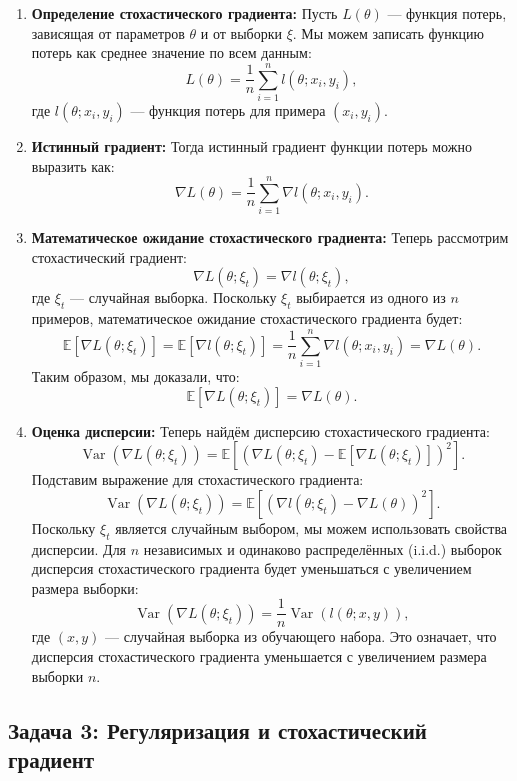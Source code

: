 \begin{enumerate}
    \item \textbf{Определение стохастического градиента:} Пусть \( L(\theta) \) — функция потерь, зависящая от параметров \( \theta \) и от выборки \( \xi \). Мы можем записать функцию потерь как среднее значение по всем данным:
    $$ L(\theta) = \frac{1}{n} \sum_{i=1}^{n} l(\theta; x_i, y_i), $$
    где \( l(\theta; x_i, y_i) \) — функция потерь для примера \( (x_i, y_i) \).

    \item \textbf{Истинный градиент:} Тогда истинный градиент функции потерь можно выразить как:
    $$ \nabla L(\theta) = \frac{1}{n} \sum_{i=1}^{n} \nabla l(\theta; x_i, y_i). $$

    \item \textbf{Математическое ожидание стохастического градиента:} Теперь рассмотрим стохастический градиент:
    $$ \nabla L(\theta; \xi_t) = \nabla l(\theta; \xi_t), $$
    где \( \xi_t \) — случайная выборка. Поскольку \( \xi_t \) выбирается из одного из \( n \) примеров, математическое ожидание стохастического градиента будет:
    \[
    \mathbb{E}[\nabla L(\theta; \xi_t)] = \mathbb{E}[\nabla l(\theta; \xi_t)] = \frac{1}{n} \sum_{i=1}^{n} \nabla l(\theta; x_i, y_i) = \nabla L(\theta).
    \]
    Таким образом, мы доказали, что:
    \[
    \mathbb{E}[\nabla L(\theta; \xi_t)] = \nabla L(\theta).
    \]

    \item \textbf{Оценка дисперсии:} Теперь найдём дисперсию стохастического градиента:
    \[
    \operatorname{Var}(\nabla L(\theta; \xi_t)) = \mathbb{E}[(\nabla L(\theta; \xi_t) - \mathbb{E}[\nabla L(\theta; \xi_t)])^2].
    \]
    Подставим выражение для стохастического градиента:
    \[
    \operatorname{Var}(\nabla L(\theta; \xi_t)) = \mathbb{E}[(\nabla l(\theta; \xi_t) - \nabla L(\theta))^2].
    \]
    Поскольку \( \xi_t \) является случайным выбором, мы можем использовать свойства дисперсии. Для \( n \) независимых и одинаково распределённых (i.i.d.) выборок дисперсия стохастического градиента будет уменьшаться с увеличением размера выборки:
    $$ \operatorname{Var}(\nabla L(\theta; \xi_t)) = \frac{1}{n} \operatorname{Var}(l(\theta; x, y)), $$
    где \( (x, y) \) — случайная выборка из обучающего набора. Это означает, что дисперсия стохастического градиента уменьшается с увеличением размера выборки \( n \).
\end{enumerate}

\subsection*{Задача 3: Регуляризация и стохастический градиент}

